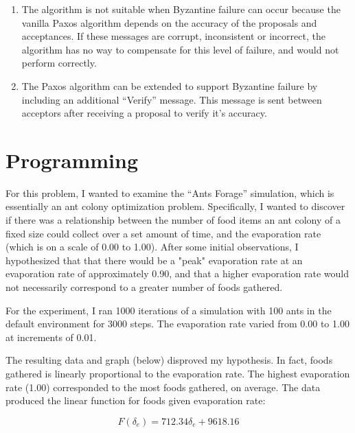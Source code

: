 \documentclass{article}
\begin{document}
\begin{enumerate}
\begin{enumerate}

\item{} %

The algorithm is not suitable when Byzantine failure can occur because the vanilla Paxos algorithm depends on the accuracy of the proposals and acceptances. If these messages are corrupt, inconsistent or incorrect, the algorithm has no way to compensate for this level of failure, and would not perform correctly.

\item{} %

The Paxos algorithm can be extended to support Byzantine failure by including an additional ``Verify'' message. This message is sent between acceptors after receiving a proposal to verify it's accuracy.

\end{enumerate}

\end{enumerate}

\newpage

\section*{Programming}

For this problem, I wanted to examine the ``Ants Forage'' simulation, which is essentially an ant colony optimization problem. Specifically, I wanted to discover if there was a relationship between the number of food items an ant colony of a fixed size could collect over a set amount of time, and the evaporation rate (which is on a scale of 0.00 to 1.00). After some initial observations, I hypothesized that that there would be a "peak" evaporation rate at an evaporation rate of approximately 0.90, and that a higher evaporation rate would not necessarily correspond to a greater number of foods gathered.

For the experiment, I ran 1000 iterations of a simulation with 100 ants in the default environment for 3000 steps. The evaporation rate varied from 0.00 to 1.00 at increments of 0.01.

The resulting data and graph (below) disproved my hypothesis. In fact, foods gathered is linearly proportional to the evaporation rate. The highest evaporation rate (1.00) corresponded to the most foods gathered, on average. The data produced the linear function for foods given evaporation rate:

    $$ F(\delta_e) = 712.34\delta_e + 9618.16 $$
\end{document}
